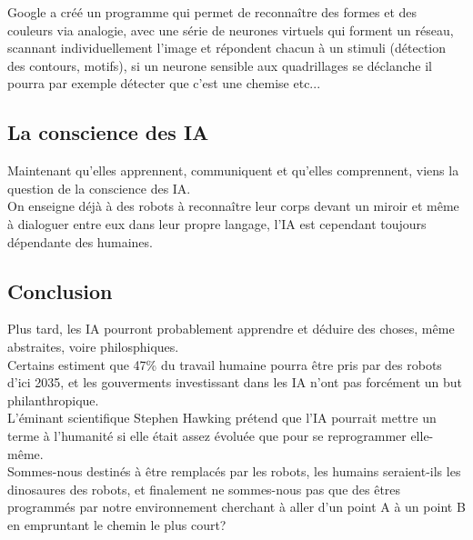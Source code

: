 \documentclass[a4paper,10pt,final,fleqn]{article}
\begin{document}
		Google a créé un programme qui permet de reconnaître des formes et des couleurs via analogie, avec une série de neurones virtuels qui forment un réseau, scannant individuellement l'image et répondent chacun à un stimuli (détection des contours, motifs), si un neurone sensible aux quadrillages se déclanche il pourra par exemple détecter que c'est une chemise etc...\\

	\subsection{La conscience des IA}

		Maintenant qu'elles apprennent, communiquent et qu'elles comprennent, viens la question de la conscience des IA.\\

		On enseigne déjà à des robots à reconnaître leur corps devant un miroir et même à dialoguer entre eux dans leur propre langage, l'IA est cependant toujours dépendante des humaines.\\

\subsection{Conclusion}

	Plus tard, les IA pourront probablement apprendre et déduire des choses, même abstraites, voire philosphiques.\\

	Certains estiment que 47\% du travail humaine pourra être pris par des robots d'ici 2035, et les gouverments investissant dans les IA n'ont pas forcément un but philanthropique.\\

	L'éminant scientifique Stephen Hawking prétend que l'IA pourrait mettre un terme à l'humanité si elle était assez évoluée que pour se reprogrammer elle-même.\\

	Sommes-nous destinés à être remplacés par les robots, les humains seraient-ils les dinosaures des robots, et finalement ne sommes-nous pas que des êtres programmés par notre environnement cherchant à aller d'un point A à un point B en empruntant le chemin le plus court?\\
\end{document}
